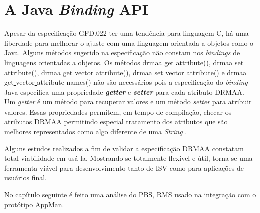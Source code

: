 \section{A Java \emph{Binding} API}

Apesar da especificação GFD.022 ter uma tendência para linguagem C, há uma liberdade para melhorar o ajuste com uma linguagem orientada a objetos como o Java. Alguns métodos sugerido na especificação não constam nos \emph{bindings} de linguagens orientadas a objetos. Os métodos drmaa\underline{ }get\underline{ }attribute(), drmaa\underline{ }set\underline{ }attribute(), drmaa\underline{ }get\underline{ }vector\underline{ }attribute(), drmaa\underline{ }set\underline{ }vector\underline{ }attribute() e drmaa\underline{ }get\underline{ }vector\underline{ } attribute \underline{ }names() não são necessários pois a especificação do \emph{binding} Java especifica uma propriedade \emph{\textbf{getter}} e \emph{\textbf{setter}} para cada atributo DRMAA. Um \emph{getter} é um método para recuperar valores e um método \emph{setter} para atribuir valores. Essas propriedades permitem, em tempo de compilação, checar os atributos DRMAA permitindo especial tratamento dos atributos que são melhores representados como algo diferente de uma \emph{String} \cite{Templeton2003}.

Alguns estudos realizados \cite{Herrera2007, Templeton2006} a fim de validar a especificação DRMAA constatam total viabilidade em usá-la. Mostrando-se totalmente flexível e útil, torna-se uma ferramenta viável para desenvolvimento tanto de ISV como para aplicações de usuários final.

No capítulo seguinte é feito uma análise do PBS, RMS usado na integração com o protótipo AppMan.